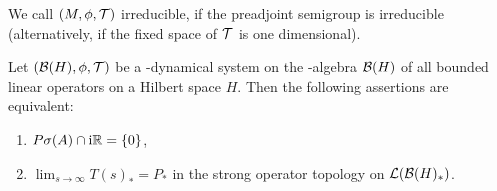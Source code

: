 We call $ (M,\phi,\mathcal{T}) $  irreducible, if the preadjoint semigroup is irreducible (alternatively, if the fixed space of $ \mathcal{T} $  is one dimensional).
\begin{proposition}\label{prop:d4-3.7}
Let $ (\mathcal{B}(H),\phi,\mathcal{T}) $  be a \WA-dynamical system on the \WA-algebra $ \mathcal{B}(H) $  of all bounded linear operators on a Hilbert space $ H $.
Then the following assertions are equivalent:
\begin{enumerate}[\upshape (a)]
\item
$ P\sigma(A) \cap \mathrm{i}\mathbb{R} = \{0\} $,

\item
$ \lim_{s \to \infty} T(s)_{*} = P_{*} $  in the strong operator topology on $ \mathcal{L}(\mathcal{B}(H)_{*}) $.
\end{enumerate}
\end{proposition}
